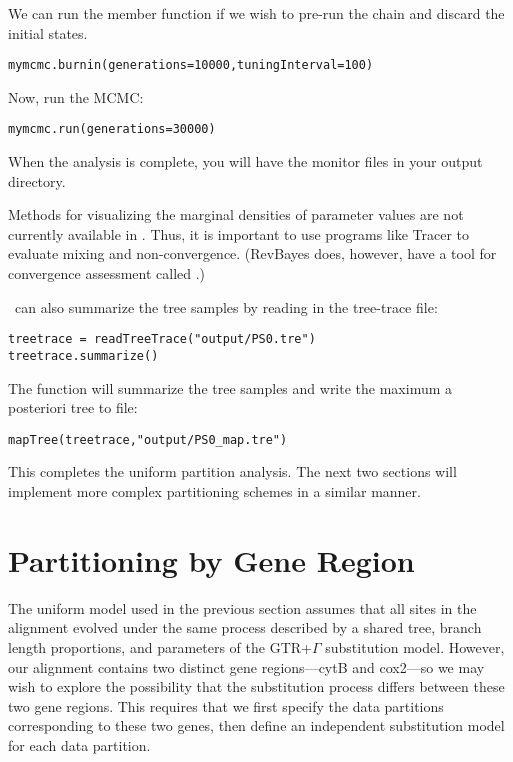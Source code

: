 We can run the  member function if we wish to pre-run the chain and discard the initial states. 
{\tt \begin{snugshade*}
\begin{lstlisting}
mymcmc.burnin(generations=10000,tuningInterval=100)
\end{lstlisting}
\end{snugshade*}}


Now, run the MCMC:
{\tt \begin{snugshade*}
\begin{lstlisting}
mymcmc.run(generations=30000)
\end{lstlisting}
\end{snugshade*}}

When the analysis is complete, you will have the monitor files in your output directory.

Methods for visualizing the marginal densities of parameter values are not currently available in \RevBayes. Thus, it is important to use programs like Tracer \citep{Rambaut2009} to evaluate mixing and non-convergence. (RevBayes does, however, have a tool for convergence assessment called .)

\RevBayes~can also summarize the tree samples by reading in the tree-trace file:
{\tt \begin{snugshade*}
\begin{lstlisting}
treetrace = readTreeTrace("output/PS0.tre")
treetrace.summarize()
\end{lstlisting}
\end{snugshade*}}


The  function will summarize the tree samples and write the maximum a posteriori tree to file:
{\tt \begin{snugshade*}
\begin{lstlisting}
mapTree(treetrace,"output/PS0_map.tre")
\end{lstlisting}
\end{snugshade*}}

This completes the uniform partition analysis.
The next two sections will implement more complex partitioning schemes in a similar manner.


\section{Partitioning by Gene Region}\label{secByGene}

The uniform model used in the previous section assumes that all sites in the alignment evolved under the same process described by a shared tree, branch length proportions, and parameters of the GTR+$\Gamma$ substitution model.
However, our alignment contains two distinct gene regions---cytB and cox2---so we may wish to explore the possibility that the substitution process differs between these two gene regions.
This requires that we first specify the data partitions corresponding to these two genes, then define an independent substitution model for each data partition. 


